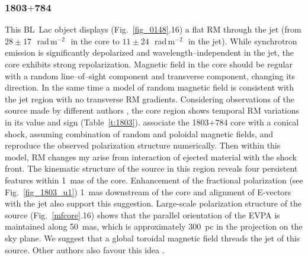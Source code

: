 \documentclass[a4paper,fleqn,usenatbib,useAMS]{mnras}
\newcommand{\rmu}{\,rad\,m$^{-2}$\,} %
\begin{document}
\subsubsection{1803$+$784}
This BL~Lac object displays (Fig.~\ref{fig_0148}.16) a flat RM through the jet (from $28\pm17$~\rmu\ in the core to $11\pm24$~\rmu\ in the jet). 
While synchrotron emission is significantly depolarized and wavelength--independent in the jet, the core exhibits strong repolarization. 
Magnetic field in the core should be regular with a random line--of--sight component and transverse component, changing its direction.
In the same time a model of random magnetic field is consistent with the jet region with no transverse RM gradients.
Considering observations of the source made by different authors \citep{2003MNRAS.339..669G,jorstad_etal07,zavala_taylor_03,mahmud_etal09,hovatta_etal12}, the core region shows temporal RM variations in its value and sign (Table~\ref{t:1803}).
\citet{2013ApJ...772...14C} associate the 1803$+$784 core with a conical shock, assuming combination of random and poloidal magnetic fields, and reproduce the observed polarization structure numerically. 
Then within this model, RM changes my arise from interaction of ejected material with the shock front.
The kinematic structure of the source in this region reveals \citep{2016AJ....152...12L} four persistent features within 1~mas of the core.
Enhancement of the fractional polarization (see Fig.~\ref{fig_1803_u1}) 1~mas downstream of the core and alignment of E-vectors with the jet  also support this suggestion.
Large-scale polarization structure of the source (Fig.~\ref{mfcore}.16) shows that the parallel orientation of the EVPA is maintained along 50~mas, which is approximately 300~pc in the projection on the sky plane.
We suggest that a global toroidal magnetic field threads the jet of this source.
Other authors also favour this idea \citep[e.g.][]{1999NewAR..43..691G,2003MNRAS.339..669G}.
\end{document}
